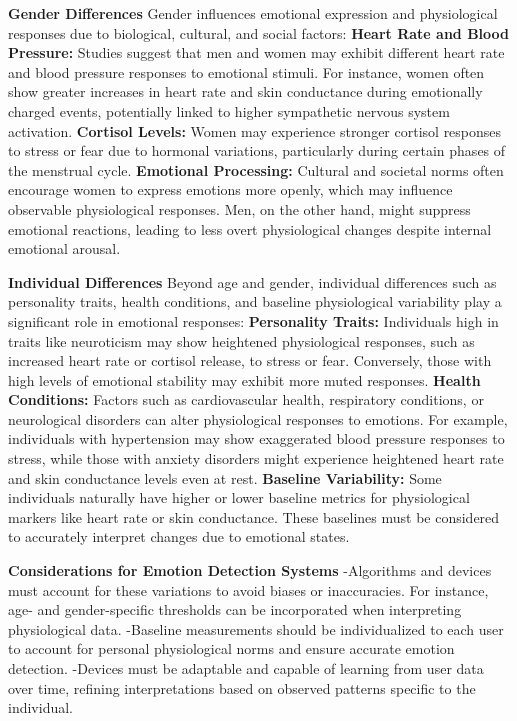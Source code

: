 \documentclass[12pt, research paper]{report}
\begin{document}
	\noindent \textbf{Gender Differences}
	\newline Gender influences emotional expression and physiological responses due to biological, cultural, and social factors:
	\newline \textbf{Heart Rate and Blood Pressure:} Studies suggest that men and women may exhibit different heart rate and blood pressure responses to emotional stimuli. For instance, women often show greater increases in heart rate and skin conductance during emotionally charged events, potentially linked to higher sympathetic nervous system activation.
	\newline \textbf{Cortisol Levels:} Women may experience stronger cortisol responses to stress or fear due to hormonal variations, particularly during certain phases of the menstrual cycle.
	\newline \textbf{Emotional Processing:} Cultural and societal norms often encourage women to express emotions more openly, which may influence observable physiological responses. Men, on the other hand, might suppress emotional reactions, leading to less overt physiological changes despite internal emotional arousal.
	\bigskip 
	
	\noindent \textbf{Individual Differences}
	Beyond age and gender, individual differences such as personality traits, health conditions, and baseline physiological variability play a significant role in emotional responses:
	\newline \textbf{Personality Traits:} Individuals high in traits like neuroticism may show heightened physiological responses, such as increased heart rate or cortisol release, to stress or fear. Conversely, those with high levels of emotional stability may exhibit more muted responses.
	\newline \textbf{Health Conditions:} Factors such as cardiovascular health, respiratory conditions, or neurological disorders can alter physiological responses to emotions. For example, individuals with hypertension may show exaggerated blood pressure responses to stress, while those with anxiety disorders might experience heightened heart rate and skin conductance levels even at rest.
	\newline \textbf{Baseline Variability:} Some individuals naturally have higher or lower baseline metrics for physiological markers like heart rate or skin conductance. These baselines must be considered to accurately interpret changes due to emotional states.
	\bigskip
	
	\noindent \textbf{Considerations for Emotion Detection Systems}
	\newline -Algorithms and devices must account for these variations to avoid biases or inaccuracies. For instance, age- and gender-specific thresholds can be incorporated when interpreting physiological data.
	\newline -Baseline measurements should be individualized to each user to account for personal physiological norms and ensure accurate emotion detection.
	\newline -Devices must be adaptable and capable of learning from user data over time, refining interpretations based on observed patterns specific to the individual.
	
\end{document}
